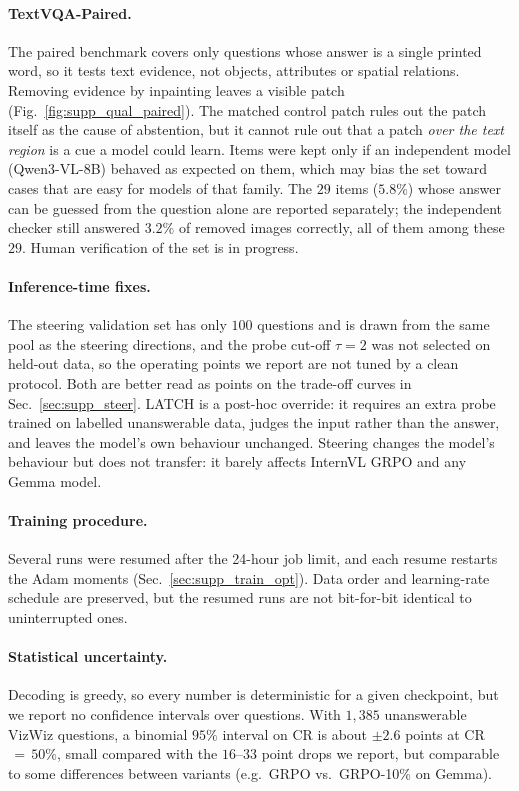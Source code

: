 \paragraph{TextVQA-Paired.}
The paired benchmark covers only questions whose answer is a single printed word, so it
tests text evidence, not objects, attributes or spatial relations. Removing evidence by
inpainting leaves a visible patch (Fig.~\ref{fig:supp_qual_paired}). The matched control
patch rules out the patch itself as the cause of abstention, but it cannot rule out that a
patch \emph{over the text region} is a cue a model could learn. Items were kept only if an
independent model (Qwen3-VL-8B) behaved as expected on them, which may bias the set toward
cases that are easy for models of that family. The $29$ items ($5.8\%$) whose answer can be
guessed from the question alone are reported separately; the independent checker still
answered $3.2\%$ of removed images correctly, all of them among these $29$. Human
verification of the set is in progress.

\paragraph{Inference-time fixes.}
The steering validation set has only $100$ questions and is drawn from the same pool as the
steering directions, and the probe cut-off $\tau{=}2$ was not selected on held-out data, so
the operating points we report are not tuned by a clean protocol. Both are better read as
points on the trade-off curves in Sec.~\ref{sec:supp_steer}. LATCH is a post-hoc
override: it requires an extra probe trained on labelled unanswerable data, judges the
input rather than the answer, and leaves the model's own behaviour unchanged. Steering
changes the model's behaviour but does not transfer: it barely affects InternVL GRPO and any
Gemma model.

\paragraph{Training procedure.}
Several runs were resumed after the 24-hour job limit, and each resume restarts the Adam
moments (Sec.~\ref{sec:supp_train_opt}). Data order and learning-rate schedule are preserved,
but the resumed runs are not bit-for-bit identical to uninterrupted ones.

\paragraph{Statistical uncertainty.}
Decoding is greedy, so every number is deterministic for a given checkpoint, but we report no
confidence intervals over questions. With $1{,}385$ unanswerable VizWiz questions, a binomial
$95\%$ interval on CR is about $\pm2.6$ points at CR$\,{=}\,50\%$, small compared with the
$16$--$33$ point drops we report, but comparable to some differences between variants (e.g.\
GRPO vs.\ GRPO-10\% on Gemma).
